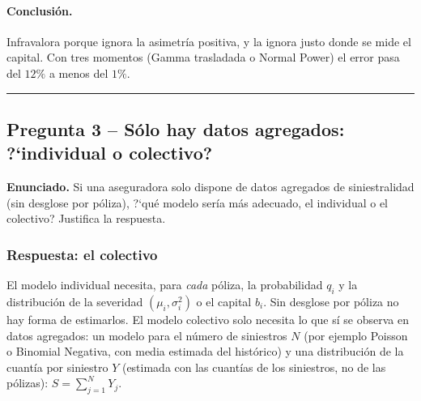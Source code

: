 \documentclass[a4paper,12pt]{article}
\begin{document}
\paragraph{Conclusi\'on.} Infravalora porque ignora la asimetr\'ia positiva, y la ignora justo donde se mide el capital. Con tres momentos (Gamma trasladada o Normal Power) el error pasa del $12\%$ a menos del $1\%$.

\bigskip\hrule\bigskip

\subsection{Pregunta 3 -- S\'olo hay datos agregados: ?`individual o colectivo?}

\noindent\textbf{Enunciado.} Si una aseguradora solo dispone de datos agregados de siniestralidad (sin desglose por p\'oliza), ?`qu\'e modelo ser\'ia m\'as adecuado, el individual o el colectivo? Justifica la respuesta.

\subsubsection*{Respuesta: el colectivo}
El modelo individual necesita, para \emph{cada} p\'oliza, la probabilidad $q_i$ y la distribuci\'on de la severidad $(\mu_i,\sigma_i^2)$ o el capital $b_i$. Sin desglose por p\'oliza no hay forma de estimarlos. El modelo colectivo solo necesita lo que s\'i se observa en datos agregados: un modelo para el n\'umero de siniestros $N$ (por ejemplo Poisson o Binomial Negativa, con media estimada del hist\'orico) y una distribuci\'on de la cuant\'ia por siniestro $Y$ (estimada con las cuant\'ias de los siniestros, no de las p\'olizas): $S=\sum_{j=1}^NY_j$.
\end{document}
